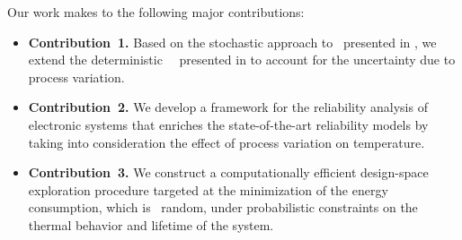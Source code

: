 Our work makes to the following major contributions:
\begin{itemize}
  \item {\bfseries Contribution~1.} Based on the stochastic approach to \tta\ presented in \cite{ukhov2014}, we extend the deterministic \DSS\ \ta\ presented in \cite{ukhov2012} to account for the uncertainty due to process variation.
  \item {\bfseries Contribution~2.} We develop a framework for the reliability analysis of electronic systems that enriches the state-of-the-art reliability models by taking into consideration the effect of process variation on temperature.
  \item {\bfseries Contribution~3.} We construct a computationally efficient design-space exploration procedure targeted at the minimization of the energy consumption, which is \apriori\ random, under probabilistic constraints on the thermal behavior and lifetime of the system.
\end{itemize}
